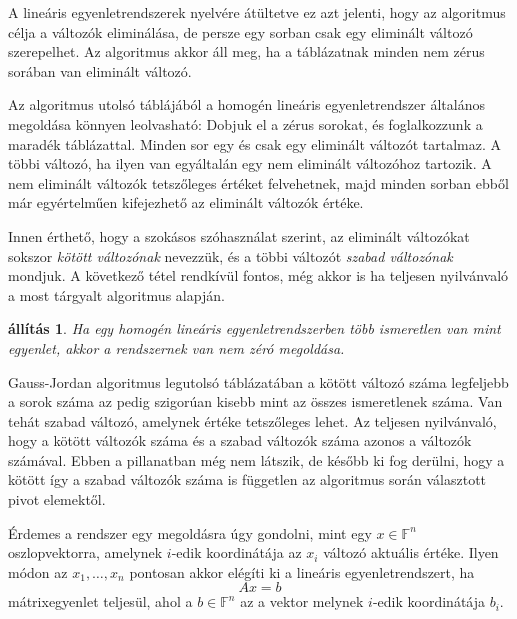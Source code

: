 \documentclass[9pt, showtrims]{memoir}
\makeatletter
\renewenvironment{proof}[1][\proofname]
    {\par\pushQED{\qed}%
    \normalfont \topsep6\p@\@plus6\p@\relax
    \trivlist
    \item[\hskip\labelsep
        \itshape
    #1\@addpunct{:}]\ignorespaces}
    {\popQED\endtrivlist\@endpefalse}
\theoremstyle{plain}
\newtheorem{proposition}{állítás}[section]
\theoremstyle{remark}
\theoremstyle{definition}
\renewcommand{\mathbf}{\mathbb}
\makeatother
\begin{document}
A lineáris egyenletrendszerek nyelvére átültetve ez azt jelenti, 
hogy az algoritmus célja a változók eliminálása,
de persze egy sorban csak egy eliminált változó szerepelhet.
Az algoritmus akkor áll meg, 
ha a táblázatnak minden nem zérus sorában van eliminált változó.

Az algoritmus utolsó táblájából a homogén lineáris egyenletrendszer általános megoldása könnyen leolvasható:
Dobjuk el a zérus sorokat, és foglalkozzunk a maradék táblázattal.
Minden sor egy és csak egy eliminált változót tartalmaz.
A többi változó, ha ilyen van egyáltalán egy nem eliminált változóhoz tartozik.
A nem eliminált változók tetszőleges értéket felvehetnek, 
majd minden sorban ebből már egyértelműen kifejezhető az eliminált változók értéke.

Innen érthető, 
hogy a szokásos szóhasználat szerint, az eliminált változókat sokszor
\emph{kötött változónak}
nevezzük,
és a többi változót 
\emph{szabad változónak}
mondjuk.
A következő tétel rendkívül fontos, még akkor is ha teljesen nyilvánvaló a most tárgyalt algoritmus alapján.
\begin{proposition}
    Ha egy homogén lineáris egyenletrendszerben több ismeretlen van mint egyenlet,
    akkor a rendszernek van nem zéró megoldása.
\end{proposition}
\begin{proof}
    Gauss-Jordan algoritmus legutolsó táblázatában
    a kötött változó száma legfeljebb a sorok száma az pedig szigorúan kisebb mint az összes ismeretlenek száma.
    Van tehát szabad változó, amelynek értéke tetszőleges lehet.
\end{proof}
Az teljesen nyilvánvaló, hogy a kötött változók száma és a szabad változók száma azonos a változók számával.
Ebben a pillanatban még nem látszik,
de később ki fog derülni, 
hogy a kötött így a szabad változók száma is független az algoritmus során választott pivot elemektől.

Érdemes a rendszer egy megoldásra úgy gondolni, mint egy $x\in\mathbf{F}^n$ oszlopvektorra,
amelynek $i$-edik koordinátája az $x_i$ változó aktuális értéke.
Ilyen módon az $x_1,\dots,x_n$ pontosan akkor elégíti ki a lineáris egyenletrendszert,
ha
\[
    Ax=b
\]
mátrixegyenlet teljesül, ahol a $b\in\mathbf{F}^n$ az a vektor melynek $i$-edik koordinátája $b_i$.
\end{document}
